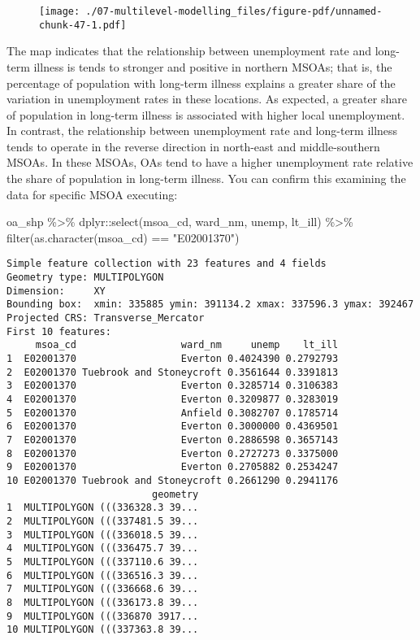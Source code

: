 \documentclass[
  letterpaper,
  krantz2]{style/krantz}
\newenvironment{Shaded}{\begin{snugshade}}{\end{snugshade}}
\newcommand{\FunctionTok}[1]{\textcolor[rgb]{0.28,0.35,0.67}{#1}}
\newcommand{\NormalTok}[1]{\textcolor[rgb]{0.00,0.23,0.31}{#1}}
\newcommand{\SpecialCharTok}[1]{\textcolor[rgb]{0.37,0.37,0.37}{#1}}
\newcommand{\StringTok}[1]{\textcolor[rgb]{0.13,0.47,0.30}{#1}}
\begin{document}
\begin{figure}[H]

{\centering \texttt{[image: ./07-multilevel-modelling\_files/figure-pdf/unnamed-chunk-47-1.pdf]}

}

\end{figure}

The map indicates that the relationship between unemployment rate and
long-term illness is tends to stronger and positive in northern MSOAs;
that is, the percentage of population with long-term illness explains a
greater share of the variation in unemployment rates in these locations.
As expected, a greater share of population in long-term illness is
associated with higher local unemployment. In contrast, the relationship
between unemployment rate and long-term illness tends to operate in the
reverse direction in north-east and middle-southern MSOAs. In these
MSOAs, OAs tend to have a higher unemployment rate relative the share of
population in long-term illness. You can confirm this examining the data
for specific MSOA executing:

\begin{Shaded}
\begin{Highlighting}[]
\NormalTok{oa\_shp }\SpecialCharTok{\%\textgreater{}\%}\NormalTok{ dplyr}\SpecialCharTok{::}\FunctionTok{select}\NormalTok{(msoa\_cd, ward\_nm, unemp, lt\_ill) }\SpecialCharTok{\%\textgreater{}\%}
    \FunctionTok{filter}\NormalTok{(}\FunctionTok{as.character}\NormalTok{(msoa\_cd) }\SpecialCharTok{==} \StringTok{"E02001370"}\NormalTok{)}
\end{Highlighting}
\end{Shaded}

\begin{verbatim}
Simple feature collection with 23 features and 4 fields
Geometry type: MULTIPOLYGON
Dimension:     XY
Bounding box:  xmin: 335885 ymin: 391134.2 xmax: 337596.3 ymax: 392467
Projected CRS: Transverse_Mercator
First 10 features:
     msoa_cd                  ward_nm     unemp    lt_ill
1  E02001370                  Everton 0.4024390 0.2792793
2  E02001370 Tuebrook and Stoneycroft 0.3561644 0.3391813
3  E02001370                  Everton 0.3285714 0.3106383
4  E02001370                  Everton 0.3209877 0.3283019
5  E02001370                  Anfield 0.3082707 0.1785714
6  E02001370                  Everton 0.3000000 0.4369501
7  E02001370                  Everton 0.2886598 0.3657143
8  E02001370                  Everton 0.2727273 0.3375000
9  E02001370                  Everton 0.2705882 0.2534247
10 E02001370 Tuebrook and Stoneycroft 0.2661290 0.2941176
                         geometry
1  MULTIPOLYGON (((336328.3 39...
2  MULTIPOLYGON (((337481.5 39...
3  MULTIPOLYGON (((336018.5 39...
4  MULTIPOLYGON (((336475.7 39...
5  MULTIPOLYGON (((337110.6 39...
6  MULTIPOLYGON (((336516.3 39...
7  MULTIPOLYGON (((336668.6 39...
8  MULTIPOLYGON (((336173.8 39...
9  MULTIPOLYGON (((336870 3917...
10 MULTIPOLYGON (((337363.8 39...
\end{verbatim}
\end{document}
